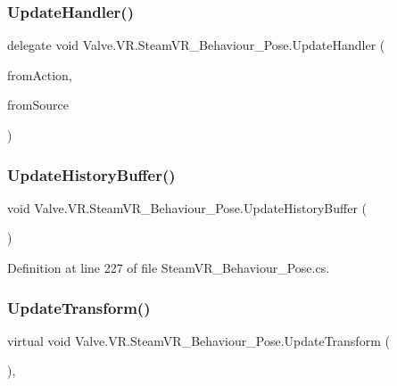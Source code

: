 \subsubsection{\texorpdfstring{UpdateHandler()}{UpdateHandler()}}
{\footnotesize\ttfamily delegate void Valve.\+V\+R.\+Steam\+V\+R\+\_\+\+Behaviour\+\_\+\+Pose.\+Update\+Handler (\begin{DoxyParamCaption}\item[{\mbox{\hyperlink{class_valve_1_1_v_r_1_1_steam_v_r___behaviour___pose}{Steam\+V\+R\+\_\+\+Behaviour\+\_\+\+Pose}}}]{from\+Action,  }\item[{\mbox{\hyperlink{namespace_valve_1_1_v_r_a82e5bf501cc3aa155444ee3f0662853f}{Steam\+V\+R\+\_\+\+Input\+\_\+\+Sources}}}]{from\+Source }\end{DoxyParamCaption})}

\mbox{\label{class_valve_1_1_v_r_1_1_steam_v_r___behaviour___pose_a1e7d5dd9ecc5dedfd163fc0bdc95684d}} 
\subsubsection{\texorpdfstring{UpdateHistoryBuffer()}{UpdateHistoryBuffer()}}
{\footnotesize\ttfamily void Valve.\+V\+R.\+Steam\+V\+R\+\_\+\+Behaviour\+\_\+\+Pose.\+Update\+History\+Buffer (\begin{DoxyParamCaption}{ }\end{DoxyParamCaption})\hspace{0.3cm}{\ttfamily [protected]}}



Definition at line 227 of file Steam\+V\+R\+\_\+\+Behaviour\+\_\+\+Pose.\+cs.

\mbox{\label{class_valve_1_1_v_r_1_1_steam_v_r___behaviour___pose_ac02430d88b500c93031ed5b21b2783fe}} 
\subsubsection{\texorpdfstring{UpdateTransform()}{UpdateTransform()}}
{\footnotesize\ttfamily virtual void Valve.\+V\+R.\+Steam\+V\+R\+\_\+\+Behaviour\+\_\+\+Pose.\+Update\+Transform (\begin{DoxyParamCaption}{ }\end{DoxyParamCaption})\hspace{0.3cm}{\ttfamily [protected]}, {\ttfamily [virtual]}}



